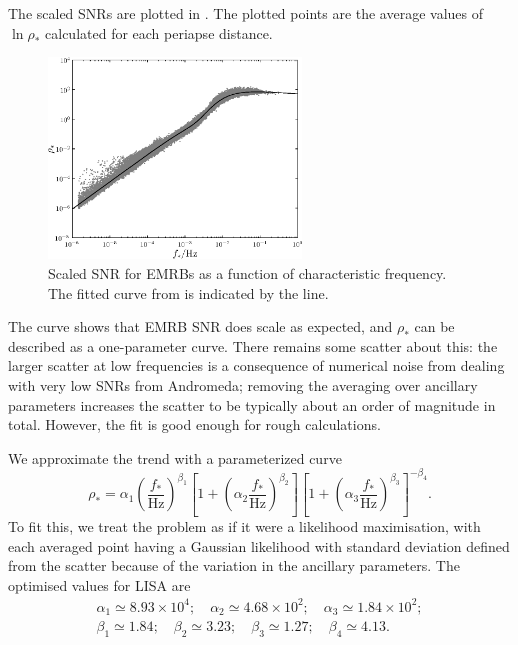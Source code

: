 The scaled SNRs are plotted in . The plotted points are the average values of $\ln \rho_\ast$ calculated for each periapse distance.
\begin{figure}
\centering
 \includegraphics[width=0.6\textwidth]{./images/Fig_SNR_scaled_fit}
 \caption{Scaled SNR for EMRBs as a function of characteristic frequency. The fitted curve from  is indicated by the line.}
 \label{fig:scaled-SNR}
\end{figure}
The curve shows that EMRB SNR does scale as expected, and $\rho_\ast$ can be described as a one-parameter curve. There remains some scatter about this: the larger scatter at low frequencies is a consequence of numerical noise from dealing with very low SNRs from Andromeda; removing the averaging over ancillary parameters increases the scatter to be typically about an order of magnitude in total. However, the fit is good enough for rough calculations.

We approximate the trend with a parameterized curve
\begin{equation}
\rho_\ast = \alpha_1 \left(\dfrac{f_\ast}{\mathrm{Hz}}\right)^{\beta_1} \left[1 + \left(\alpha_2 \dfrac{f_\ast}{\mathrm{Hz}}\right)^{\beta_2}\right]\left[1 + \left(\alpha_3 \dfrac{f_\ast}{\mathrm{Hz}}\right)^{\beta_3}\right]^{-\beta_4}.
\label{eq:scaled-SNR}
\end{equation}
To fit this, we treat the problem as if it were a likelihood maximisation, with each averaged point having a Gaussian likelihood with standard deviation defined from the scatter because of the variation in the ancillary parameters. The optimised values for LISA are
\begin{equation}
\begin{array}{c}
\alpha_1 \simeq 8.93 \times 10^4; \quad \alpha_2 \simeq 4.68 \times 10^2; \quad \alpha_3 \simeq 1.84 \times 10^2;\\
\beta_1 \simeq 1.84; \quad\beta_2 \simeq 3.23; \quad \beta_3 \simeq 1.27; \quad \beta_4 \simeq 4.13.
\end{array}
\end{equation}

